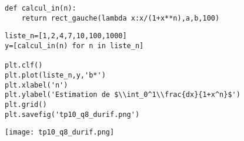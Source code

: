\begin{lstlisting}
def calcul_in(n):
    return rect_gauche(lambda x:x/(1+x**n),a,b,100)
\end{lstlisting}

\question{} 

\begin{minipage}{0.5\textwidth}
\begin{lstlisting}
liste_n=[1,2,4,7,10,100,1000]
y=[calcul_in(n) for n in liste_n]

plt.clf()
plt.plot(liste_n,y,'b*')
plt.xlabel('n')
plt.ylabel('Estimation de $\\int_0^1\\frac{dx}{1+x^n}$')
plt.grid()
plt.savefig('tp10_q8_durif.png')
\end{lstlisting}
\end{minipage}
\begin{minipage}{0.5\textwidth}
\texttt{[image: tp10\_q8\_durif.png]}
\end{minipage}